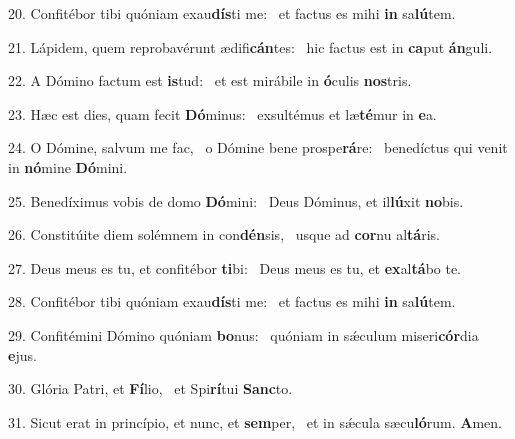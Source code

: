 20. Confitébor tibi quóniam exau\textbf{dís}ti me: \ast\  et factus es mihi \textbf{in} sa\textbf{lú}tem.\

21. Lápidem, quem reprobavérunt ædifi\textbf{cán}tes: \ast\  hic factus est in \textbf{ca}put \textbf{án}guli.\

22. A Dómino factum est \textbf{is}tud: \ast\  et est mirábile in \textbf{ó}culis \textbf{nos}tris.\

23. Hæc est dies, quam fecit \textbf{Dó}minus: \ast\  exsultémus et læ\textbf{té}mur in \textbf{e}a.\

24. O Dómine, salvum me fac, \dag\  o Dómine bene prospe\textbf{rá}re: \ast\  benedíctus qui venit in \textbf{nó}mine \textbf{Dó}mini.\

25. Benedíximus vobis de domo \textbf{Dó}mini: \ast\  Deus Dóminus, et il\textbf{lú}xit \textbf{no}bis.\

26. Constitúite diem solémnem in con\textbf{dén}sis, \ast\  usque ad \textbf{cor}nu al\textbf{tá}ris.\

27. Deus meus es tu, et confitébor \textbf{ti}bi: \ast\  Deus meus es tu, et \textbf{ex}al\textbf{tá}bo te.\

28. Confitébor tibi quóniam exau\textbf{dís}ti me: \ast\  et factus es mihi \textbf{in} sa\textbf{lú}tem.\

29. Confitémini Dómino quóniam \textbf{bo}nus: \ast\  quóniam in sǽculum miseri\textbf{cór}dia \textbf{e}jus.\

30. Glória Patri, et \textbf{Fí}lio, \ast\  et Spi\textbf{rí}tui \textbf{Sanc}to.\

31. Sicut erat in princípio, et nunc, et \textbf{sem}per, \ast\  et in sǽcula sæcu\textbf{ló}rum. \textbf{A}men.\

